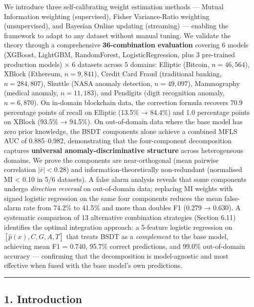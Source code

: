 \documentclass[
  11pt,
]{article}
\begin{document}
We introduce three self-calibrating weight estimation methods — Mutual
Information weighting (supervised), Fisher Variance-Ratio weighting
(unsupervised), and Bayesian Online updating (streaming) — enabling the
framework to adapt to any dataset without manual tuning. We validate the
theory through a comprehensive \textbf{36-combination evaluation}
covering 6 models (XGBoost, LightGBM, RandomForest, LogisticRegression,
plus 3 pre-trained production models) × 6 datasets across 5 domains:
Elliptic (Bitcoin, \(n = 46{,}564\)), XBlock (Ethereum,
\(n = 9{,}841\)), Credit Card Fraud (traditional banking,
\(n = 284{,}807\)), Shuttle (NASA anomaly detection, \(n = 49{,}097\)),
Mammography (medical anomaly, \(n = 11{,}183\)), and Pendigits (digit
recognition anomaly, \(n = 6{,}870\)). On in-domain blockchain data, the
correction formula recovers 70.9 percentage points of recall on Elliptic
(13.5\% → 84.4\%) and 1.0 percentage points on XBlock (93.5\% → 94.5\%).
On out-of-domain data where the base model has zero prior knowledge, the
BSDT components alone achieve a combined MFLS AUC of 0.885–0.982,
demonstrating that the four-component decomposition captures
\textbf{universal anomaly-discriminative structure} across heterogeneous
domains. We prove the components are near-orthogonal (mean pairwise
correlation \(|\bar{r}| < 0.28\)) and information-theoretically
non-redundant (normalised MI \textless{} 0.10 in 5/6 datasets). A false
alarm analysis reveals that some components undergo \emph{direction
reversal} on out-of-domain data; replacing MI weights with signed
logistic regression on the same four components reduces the mean
false-alarm rate from 74.2\% to 41.5\% and more than doubles F1 (0.279 →
0.630). A systematic comparison of 13 alternative combination strategies
(Section 6.11) identifies the optimal integration approach: a 5-feature
logistic regression on \([\hat{p}(x), C, G, A, T]\) that treats BSDT as
a \emph{complement} to the base model, achieving mean F1 = 0.740, 95.7\%
correct predictions, and 99.0\% out-of-domain accuracy — confirming that
the decomposition is model-agnostic and most effective when fused with
the base model’s own predictions.

\begin{center}\rule{0.5\linewidth}{0.5pt}\end{center}

\subsection{1. Introduction}\label{introduction}
\end{document}
